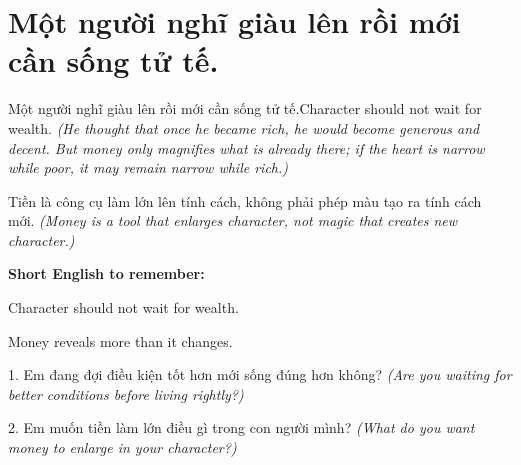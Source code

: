 \section{Một người nghĩ giàu lên rồi mới cần sống tử tế.}
\begin{truyen}{Một người nghĩ giàu lên rồi mới cần sống tử tế.}{Character should not wait for wealth.}
\textit{(He thought that once he became rich, he would become generous and decent. But money only magnifies what is already there; if the heart is narrow while poor, it may remain narrow while rich.)}
\end{truyen}
\begin{baihoc}
Tiền là công cụ làm lớn lên tính cách, không phải phép màu tạo ra tính cách mới.
\textit{(Money is a tool that enlarges character, not magic that creates new character.)}
\end{baihoc}
\begin{ghinhoanh}
\textbf{Short English to remember:}

Character should not wait for wealth.

Money reveals more than it changes.
\end{ghinhoanh}
\begin{tuhocnhanh}
1. Em đang đợi điều kiện tốt hơn mới sống đúng hơn không? \textit{(Are you waiting for better conditions before living rightly?)}

2. Em muốn tiền làm lớn điều gì trong con người mình? \textit{(What do you want money to enlarge in your character?)}
\end{tuhocnhanh}
\ngancach

